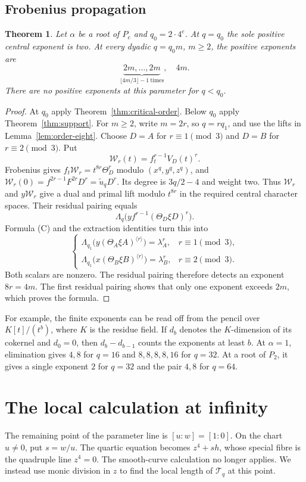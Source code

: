 \documentclass[11pt,a4paper,reqno]{amsart}
\numberwithin{equation}{section}
\theoremstyle{plain}
\newtheorem{theorem}{Theorem}[section]
\theoremstyle{definition}
\theoremstyle{remark}
\begin{document}
\subsection{Frobenius propagation}
\begin{theorem}\label{thm:finite-orders}
Let $\alpha$ be a root of $P_e$ and $q_0=2\cdot4^e$.
At $q=q_0$ the sole positive central exponent is two.
At every dyadic $q=q_0m$, $m\geq2$, the positive exponents are
\[
\underbrace{2m,\ldots,2m}_{\lfloor4m/3\rfloor-1\ \text{times}},\quad4m.
\]
There are no positive exponents at this parameter for $q<q_0$.
\end{theorem}
\begin{proof}
At $q_0$ apply Theorem~\ref{thm:critical-order}. Below $q_0$ apply Theorem~\ref{thm:support}. For $m\geq2$, write $m=2r$, so $q=rq_1$, and use the lifts in Lemma~\ref{lem:order-eight}. Choose $D=A$ for $r\equiv1\pmod3$ and $D=B$ for $r\equiv2\pmod3$. Put
\[
\mathcal W_r(t)=f_t^{r-1}V_D(t)^r.
\]
Frobenius gives $f_t\mathcal W_r=t^{8r}\Theta_D^r$ modulo $(x^q,y^q,z^q)$, and
$\mathcal W_r(0)=f^{2r-1}F^{2r}D^r=\widetilde u_qD^r$.
Its degree is $3q/2-4$ and weight two. Thus $\mathcal W_r$ and $y\mathcal W_r$ give a dual and primal lift modulo $t^{8r}$ in the required central character spaces. Their residual pairing equals
\[
\Lambda_q\bigl(yf^{r-1}(\Theta_D\xi D)^r\bigr).
\]
Formula (C) and the extraction identities turn this into
\[
\begin{cases}
\Lambda_{q_1}\bigl(y(\Theta_A\xi A)^{\langle r\rangle}\bigr)=\lambda_A^r,&r\equiv1\pmod3,\\
\Lambda_{q_1}\bigl(x(\Theta_B\xi B)^{\langle r\rangle}\bigr)=\lambda_B^r,&r\equiv2\pmod3.
\end{cases}
\]
Both scalars are nonzero. The residual pairing therefore detects an
exponent $8r=4m$. The first residual pairing shows that only one exponent
exceeds $2m$, which proves the formula.
\end{proof}

For example, the finite exponents can be read off from the pencil
over $K[t]/(t^b)$, where $K$ is the residue field. If $d_b$ denotes
the $K$-dimension of its cokernel and $d_0=0$, then $d_b-d_{b-1}$
counts the exponents at least $b$. At $\alpha=1$, elimination gives
$4,8$ for $q=16$ and $8,8,8,8,16$ for $q=32$. At a root of $P_2$,
it gives a single exponent $2$ for $q=32$ and the pair $4,8$ for $q=64$.

\section{The local calculation at infinity}\label{sec:infinity}
The remaining point of the parameter line is $[u:w]=[1:0]$.
On the chart $u\ne0$, put $s=w/u$. The quartic equation becomes
$z^4+sh$, whose special fibre is the quadruple line $z^4=0$.
The smooth-curve calculation no longer applies. We instead use monic
division in $z$ to find the local length of $\mathcal T_q$ at this point.
\end{document}
